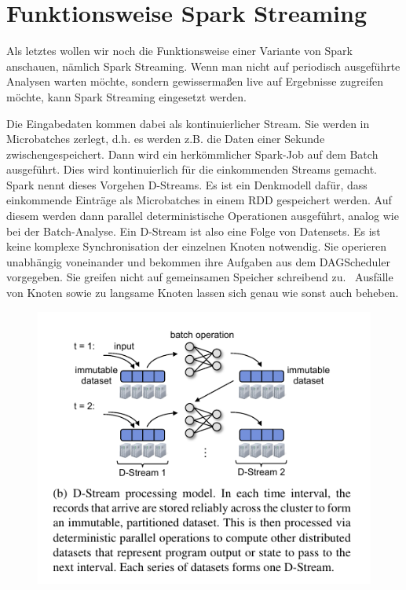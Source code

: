 \section[Funktionsweise Spark
Streaming]{\rmfamily Funktionsweise Spark
Streaming}
Als letztes wollen wir noch die Funktionsweise einer Variante von Spark
anschauen, nämlich Spark Streaming. Wenn man nicht auf periodisch
ausgeführte Analysen warten möchte, sondern gewissermaßen live auf
Ergebnisse zugreifen möchte, kann Spark Streaming eingesetzt werden.

Die Eingabedaten kommen dabei als kontinuierlicher Stream. Sie werden in
Microbatches zerlegt, d.h. es werden z.B. die Daten einer Sekunde
zwischengespeichert. Dann wird ein herkömmlicher Spark-Job auf dem
Batch ausgeführt. Dies wird kontinuierlich für die einkommenden Streams
gemacht. Spark nennt dieses Vorgehen D-Streams. Es ist ein Denkmodell
dafür, dass einkommende Einträge als Microbatches in einem RDD
gespeichert werden. Auf diesem werden dann parallel deterministische
Operationen ausgeführt, analog wie bei der Batch-Analyse. Ein D-Stream
ist also eine Folge von Datensets. Es ist keine komplexe
Synchronisation der einzelnen Knoten notwendig. Sie operieren
unabhängig voneinander und bekommen ihre Aufgaben aus dem DAGScheduler
vorgegeben. Sie greifen nicht auf gemeinsamen Speicher schreibend zu.
\ Ausfälle von Knoten sowie zu langsame Knoten lassen sich genau wie
sonst auch beheben. 

\begin{figure}
\centering
\includegraphics[width=\textwidth]{bilder/Seminartext-img4.png}
\end{figure}
